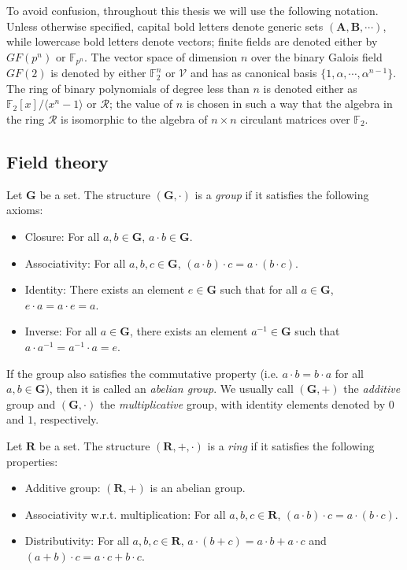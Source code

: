 To avoid confusion, throughout this thesis we will use the following notation.
    Unless otherwise specified, capital bold letters denote generic sets $(\mathbf{A}, \mathbf{B}, \cdots)$, while lowercase bold letters denote vectors; 
    finite fields are denoted either by $GF(p^n)$ or $\mathds{F}_{p^n}$. The vector space of dimension $n$ over the binary Galois field $GF(2)$ is denoted by
    either $\mathds{F}_2^n$ or $\mathcal{V}$ and has as canonical basis $\{1, \alpha, \cdots, \alpha^{n-1}\}$. The ring of binary polynomials of degree less than $n$ is denoted either as $\mathds{F}_2[x]/\langle x^n-1 \rangle$ or $\mathcal{R}$;
    the value of $n$ is chosen in such a way that the algebra in the ring $\mathcal{R}$ is isomorphic to the algebra of $n\times n$ circulant matrices over $\mathds{F}_2$.
    
\subsection{Field theory}
\begin{definition}[Group]
    Let $\mathbf{G}$ be a set. The structure $(\mathbf{G}, \cdot)$ is a \emph{group} if it satisfies the following axioms:
    \begin{itemize}
        \item Closure: For all $a, b \in \mathbf{G}$, $a \cdot b \in \mathbf{G}$.
        \item Associativity: For all $a, b, c \in \mathbf{G}$, $(a \cdot b) \cdot c = a \cdot (b \cdot c)$.
        \item Identity: There exists an element $e \in \mathbf{G}$ such that for all $a \in \mathbf{G}$, $e \cdot a = a \cdot e = a$.
        \item Inverse: For all $a \in \mathbf{G}$, there exists an element $a^{-1} \in \mathbf{G}$ such that $a \cdot a^{-1} = a^{-1} \cdot a = e$.
    \end{itemize}
    If the group also satisfies the commutative property (i.e. $a \cdot b = b \cdot a$ for all $a, b \in \mathbf{G}$), then it is called an \emph{abelian group}.
    We usually call $(\mathbf{G}, +)$ the \emph{additive} group and $(\mathbf{G}, \cdot)$ the \emph{multiplicative} group, with identity elements denoted by $0$ and $1$, respectively.
\end{definition}

\begin{definition}[Ring]
    Let $\mathbf{R}$ be a set. The structure $(\mathbf{R}, +, \cdot)$ is a \emph{ring} if it satisfies the following properties:
    \begin{itemize}
        \item Additive group: $(\mathbf{R}, +)$ is an abelian group.
        \item Associativity w.r.t. multiplication: For all $a, b, c \in \mathbf{R}$, $(a \cdot b) \cdot c = a \cdot (b \cdot c)$.
        \item Distributivity: For all $a, b, c \in \mathbf{R}$, $a \cdot (b + c) = a \cdot b + a \cdot c$ and $(a + b) \cdot c = a \cdot c + b \cdot c$.
    \end{itemize}
\end{definition}

